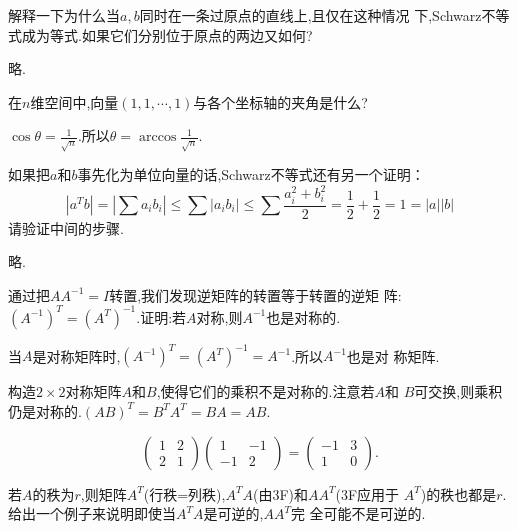 ﻿\documentclass{book} \usepackage{exsheets} \usepackage{xeCJK}
\begin{document}
\begin{question}
  解释一下为什么当$a,b$同时在一条过原点的直线上,且仅在这种情况
  下,Schwarz不等式成为等式.如果它们分别位于原点的两边又如何?
\end{question}
\begin{solution}
  略.
\end{solution}
\begin{question}
  在$n$维空间中,向量$(1,1,\cdots,1)$与各个坐标轴的夹角是什么?
\end{question}
\begin{solution}
  $\cos\theta=\frac{1}{\sqrt{n}}$.所以$\theta=\arccos \frac{1}{\sqrt{n}}$.
\end{solution}
\begin{question}
  如果把$a$和$b$事先化为单位向量的话,Schwarz不等式还有另一个证明：
$$
|a^Tb|=\left| \sum a_ib_i   \right|\leq\sum |a_ib_i|\leq \sum \frac{a_i^2+b_i^2}{2}=\frac{1}{2}+\frac{1}{2}=1=|a||b|
$$
请验证中间的步骤.
\end{question}
\begin{solution}
  略.
\end{solution}
\begin{question}
通过把$AA^{-1}=I$转置,我们发现逆矩阵的转置等于转置的逆矩
阵:$(A^{-1})^T=(A^T)^{-1}$.证明:若$A$对称,则$A^{-1}$也是对称的.
\end{question}
\begin{solution}
  当$A$是对称矩阵时,$(A^{-1})^T=(A^T)^{-1}=A^{-1}$.所以$A^{-1}$也是对
  称矩阵.
\end{solution}
\begin{question}
  构造$2\times 2$对称矩阵$A$和$B$,使得它们的乘积不是对称的.注意若$A$和
  $B$可交换,则乘积仍是对称的.$(AB)^T=B^TA^T=BA=AB$.
\end{question}
\begin{solution}
$$
\begin{pmatrix}
  1&2\\
  2&1
\end{pmatrix}
\begin{pmatrix}
  1&-1\\
  -1&2
\end{pmatrix}=
\begin{pmatrix}
  -1&3\\
  1&0
\end{pmatrix}.
$$
\end{solution}
\begin{question}
  若$A$的秩为$r$,则矩阵$A^T$(行秩=列秩),$A^TA$(由3F)和$AA^T$(3F应用于
  $A^T$)的秩也都是$r$.给出一个例子来说明即使当$A^TA$是可逆的,$AA^T$完
  全可能不是可逆的.
\end{question}
\end{document}
